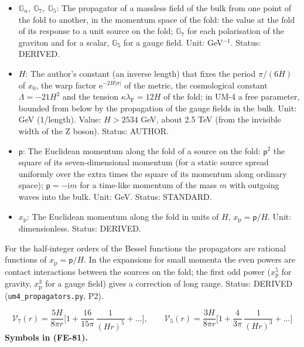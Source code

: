 \documentclass[
  10pt,
]{article}
\providecommand{\tightlist}{%
  \setlength{\itemsep}{0pt}\setlength{\parskip}{0pt}}
\begin{document}
\begin{itemize}
\tightlist
\item
  \(\mathbb{G}_n,\ \mathbb{G}_7,\ \mathbb{G}_5\): The propagator of a
  massless field of the bulk from one point of the fold to another, in
  the momentum space of the fold: the value at the fold of its response
  to a unit source on the fold; \(\mathbb{G}_7\) for each polarisation
  of the graviton and for a scalar, \(\mathbb{G}_5\) for a gauge field.
  Unit: GeV\(^{-1}\). Status: DERIVED.
\item
  \(H\): The author's constant (an inverse length) that fixes the period
  \(\pi/(6H)\) of \(x_0\), the warp factor
  \(\mathrm{e}^{-2H\lvert\sigma\rvert}\) of the metric, the cosmological
  constant \(\Lambda = -21H^2\) and the tension
  \(\kappa\lambda_{\mathrm{F}} = 12H\) of the fold; in UM-4 a free
  parameter, bounded from below by the propagation of the gauge fields
  in the bulk. Unit: GeV (1/length). Value: \(H > 2534\) GeV, about 2.5
  TeV (from the invisible width of the Z boson). Status: AUTHOR.
\item
  \(\mathsf{p}\): The Euclidean momentum along the fold of a source on
  the fold: \(\mathsf{p}^2\) the square of its seven-dimensional
  momentum (for a static source spread uniformly over the extra times
  the square of its momentum along ordinary space);
  \(\mathsf{p} = -\mathrm{i}m\) for a time-like momentum of the mass
  \(m\) with outgoing waves into the bulk. Unit: GeV. Status: STANDARD.
\item
  \(x_{\mathrm{p}}\): The Euclidean momentum along the fold in units of
  \(H\), \(x_{\mathrm{p}} = \mathsf{p}/H\). Unit: dimensionless. Status:
  DERIVED.
\end{itemize}

For the half-integer orders of the Bessel functions the propagators are
rational functions of \(x_{\mathrm{p}} = \mathsf{p}/H\). In the
expansions for small momenta the even powers are contact interactions
between the sources on the fold; the first odd power
(\(x_{\mathrm{p}}^5\) for gravity, \(x_{\mathrm{p}}^3\) for a gauge
field) gives a correction of long range. Status: DERIVED
(\texttt{um4\_propagators.py}, P2).

\[
\mathcal{V}_7(r) = \frac{5H}{8\pi r}\Big[1 + \frac{16}{15\pi}\,\frac{1}{(Hr)^5} + \dots\Big],\qquad
\mathcal{V}_5(r) = \frac{3H}{8\pi r}\Big[1 + \frac{4}{3\pi}\,\frac{1}{(Hr)^3} + \dots\Big] \tag{FE-81}
\] \textbf{Symbols in (FE-81).}
\end{document}
